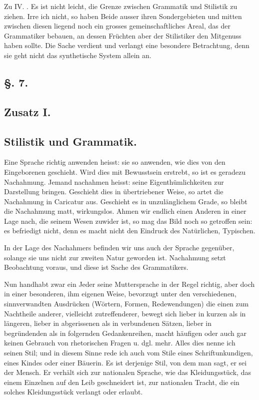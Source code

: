 Zu IV. . Es ist nicht leicht, die Grenze zwischen Grammatik und Stilistik zu ziehen. Irre ich nicht, so haben Beide ausser ihren Sondergebieten und mitten zwischen diesen liegend noch ein grosses gemeinschaftliches Areal, das der Grammatiker bebauen, an dessen Früchten aber der Stilistiker den Mitgenuss haben sollte. Die Sache verdient und verlangt eine besondere Betrachtung, denn sie geht nicht das synthetische System allein an.

\clearpage
{}
\subsection*{§. 7.}\label{II.VI.7}
\subsection*{Zusatz I.}
\subsection*{Stilistik und Grammatik.}

Eine Sprache richtig anwenden heisst: sie so anwenden, wie dies von den Eingeborenen geschieht. Wird dies mit Bewusstsein erstrebt, so ist es geradezu Nachahmung. Jemand nachahmen heisst: seine Eigen\label{fp.109}thümlichkeiten zur Darstellung bringen. Geschieht dies in übertriebener Weise, so artet die Nachahmung in Caricatur aus. Geschieht es in unzulänglichem Grade, so bleibt die Nachahmung matt, wirkungslos. Ahmen wir endlich einen Anderen in einer Lage nach, die seinem Wesen zuwider ist, so mag das Bild noch so getroffen sein: es befriedigt nicht, denn es macht nicht den Eindruck des Natürlichen, Typischen.

In der Lage des Nachahmers befinden wir uns auch der Sprache gegenüber, solange sie uns nicht zur zweiten Natur geworden ist. Nachahmung setzt Beobachtung voraus, und diese ist Sache des Grammatikers.

Nun handhabt zwar ein Jeder seine Muttersprache in der Regel richtig, aber doch in einer besonderen, ihm eigenen Weise, bevorzugt unter den ver\-\label{sp.105}schie\-denen, sinnverwandten Ausdrücken (Wörtern, Formen, Redewendungen) die einen zum Nachtheile anderer, vielleicht zutreffenderer, bewegt sich lieber in kurzen als in längeren, lieber in abgerissenen als in verbundenen Sätzen, lieber in begründenden als in folgernden Gedankenreihen, macht häufigen oder auch gar keinen Gebrauch von rhetorischen Fragen u. dgl. mehr. Alles dies nenne ich seinen Stil; und in diesem Sinne rede ich auch vom Stile eines Schriftunkundigen, eines Kindes oder einer Bäuerin. Es ist derjenige Stil, von dem man sagt, er sei der Mensch. Er verhält sich zur nationalen Sprache, wie das Kleidungsstück, das einem Einzelnen auf den Leib geschneidert ist, zur nationalen Tracht, die ein solches Kleidungsstück verlangt oder erlaubt.


